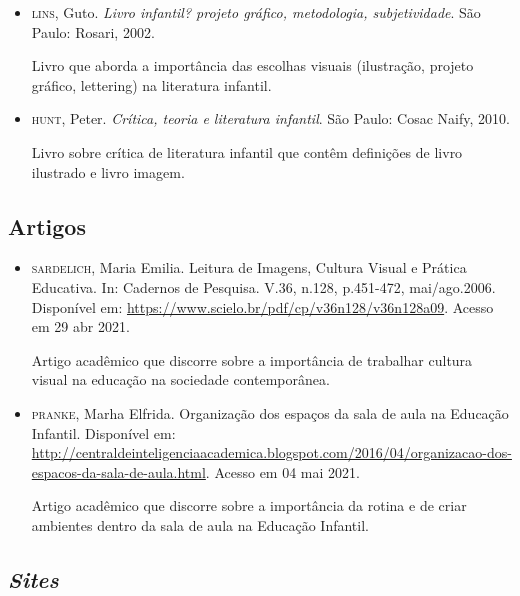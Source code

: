 \documentclass[11pt]{extarticle}
\begin{document}
\begin{itemize}
\item \textsc{lins}, Guto. \textit{Livro infantil? projeto gráfico, metodologia, subjetividade}. São Paulo: Rosari, 2002.

Livro que aborda a importância das escolhas visuais (ilustração, projeto gráfico, lettering) na literatura infantil.  

\item \textsc{hunt}, Peter. \textit{Crítica, teoria e literatura infantil}. São Paulo: Cosac Naify, 2010.

Livro sobre crítica de literatura infantil que contêm definições de livro ilustrado e livro imagem. 
\end{itemize}

\subsection{Artigos}

\begin{itemize}
\item \textsc{sardelich}, Maria Emilia. Leitura de Imagens, Cultura Visual e Prática Educativa. 
In: Cadernos de Pesquisa. V.36, n.128, p.451-472, mai/ago.2006. Disponível em: \url{https://www.scielo.br/pdf/cp/v36n128/v36n128a09}. 
Acesso em 29 abr 2021. 

Artigo acadêmico que discorre sobre a importância de trabalhar cultura 
visual na educação na sociedade contemporânea. 

\item \textsc{pranke}, Marha Elfrida. Organização dos espaços da sala de aula na Educação Infantil. Disponível em: \url{http://centraldeinteligenciaacademica.blogspot.com/2016/04/organizacao-dos-espacos-da-sala-de-aula.html}. Acesso em 04 mai 2021. 

Artigo acadêmico que discorre sobre a importância da rotina e de criar ambientes dentro da sala de aula na Educação Infantil.  
\end{itemize}

\subsection{\textit{Sites}}
\end{document}
